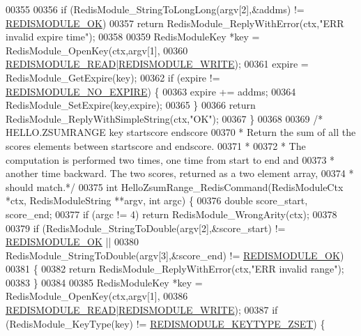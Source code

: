 \begin{DoxyCode}
00355 
00356     \textcolor{keywordflow}{if} (RedisModule\_StringToLongLong(argv[2],&addms) != \hyperlink{redismodule_8h_a1bc5bfd69abcd378ff52c640adc5418d}{REDISMODULE\_OK})
00357         \textcolor{keywordflow}{return} RedisModule\_ReplyWithError(ctx,\textcolor{stringliteral}{"ERR invalid expire time"});
00358 
00359     RedisModuleKey *key = RedisModule\_OpenKey(ctx,argv[1],
00360         \hyperlink{redismodule_8h_a369d2ff4bca768b05f826a12dd694825}{REDISMODULE\_READ}|\hyperlink{redismodule_8h_a73b37117ef94cb4a904361afcc51b6b4}{REDISMODULE\_WRITE});
00361     expire = RedisModule\_GetExpire(key);
00362     \textcolor{keywordflow}{if} (expire != \hyperlink{redismodule_8h_aa3f706d438eca2eca600845f5ee2e9b3}{REDISMODULE\_NO\_EXPIRE}) \{
00363         expire += addms;
00364         RedisModule\_SetExpire(key,expire);
00365     \}
00366     \textcolor{keywordflow}{return} RedisModule\_ReplyWithSimpleString(ctx,\textcolor{stringliteral}{"OK"});
00367 \}
00368 
00369 \textcolor{comment}{/* HELLO.ZSUMRANGE key startscore endscore}
00370 \textcolor{comment}{ * Return the sum of all the scores elements between startscore and endscore.}
00371 \textcolor{comment}{ *}
00372 \textcolor{comment}{ * The computation is performed two times, one time from start to end and}
00373 \textcolor{comment}{ * another time backward. The two scores, returned as a two element array,}
00374 \textcolor{comment}{ * should match.*/}
00375 \textcolor{keywordtype}{int} HelloZsumRange\_RedisCommand(RedisModuleCtx *ctx, RedisModuleString **argv, \textcolor{keywordtype}{int} argc) \{
00376     \textcolor{keywordtype}{double} score\_start, score\_end;
00377     \textcolor{keywordflow}{if} (argc != 4) \textcolor{keywordflow}{return} RedisModule\_WrongArity(ctx);
00378 
00379     \textcolor{keywordflow}{if} (RedisModule\_StringToDouble(argv[2],&score\_start) != \hyperlink{redismodule_8h_a1bc5bfd69abcd378ff52c640adc5418d}{REDISMODULE\_OK} ||
00380         RedisModule\_StringToDouble(argv[3],&score\_end) != \hyperlink{redismodule_8h_a1bc5bfd69abcd378ff52c640adc5418d}{REDISMODULE\_OK})
00381     \{
00382         \textcolor{keywordflow}{return} RedisModule\_ReplyWithError(ctx,\textcolor{stringliteral}{"ERR invalid range"});
00383     \}
00384 
00385     RedisModuleKey *key = RedisModule\_OpenKey(ctx,argv[1],
00386         \hyperlink{redismodule_8h_a369d2ff4bca768b05f826a12dd694825}{REDISMODULE\_READ}|\hyperlink{redismodule_8h_a73b37117ef94cb4a904361afcc51b6b4}{REDISMODULE\_WRITE});
00387     \textcolor{keywordflow}{if} (RedisModule\_KeyType(key) != \hyperlink{redismodule_8h_a93d1514d4c11cc65551b36cfd9a72cc2}{REDISMODULE\_KEYTYPE\_ZSET}) \{

\end{DoxyCode}
